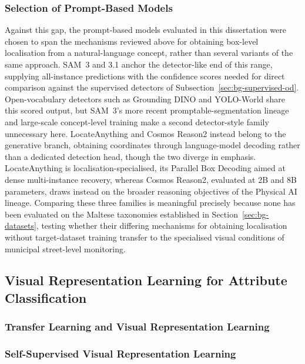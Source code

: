\subsubsection{Selection of Prompt-Based Models}
\label{sec:bg-zs-selection}
Against this gap, the prompt-based models evaluated in this dissertation were chosen to span the mechanisms reviewed above for obtaining box-level localisation from a natural-language concept, rather than several variants of the same approach. \gls{SAM}~3 and 3.1 anchor the detector-like end of this range, supplying all-instance predictions with the confidence scores needed for direct comparison against the supervised detectors of Subsection~\ref{sec:bg-supervised-od}. Open-vocabulary detectors such as Grounding DINO and YOLO-World share this scored output, but \gls{SAM}~3's more recent promptable-segmentation lineage and large-scale concept-level training make a second detector-style family unnecessary here. LocateAnything and Cosmos Reason2 instead belong to the generative branch, obtaining coordinates through language-model decoding rather than a dedicated detection head, though the two diverge in emphasis. LocateAnything is localisation-specialised, its Parallel Box Decoding aimed at dense multi-instance recovery, whereas Cosmos Reason2, evaluated at 2B and 8B parameters, draws instead on the broader reasoning objectives of the Physical \gls{AI} lineage. Comparing these three families is meaningful precisely because none has been evaluated on the Maltese taxonomies established in Section~\ref{sec:bg-datasets}, testing whether their differing mechanisms for obtaining localisation without target-dataset training transfer to the specialised visual conditions of municipal street-level monitoring.

\subsection{Visual Representation Learning for Attribute Classification}
\label{sec:bg-representation}

    \subsubsection{Transfer Learning and Visual Representation Learning}
    \label{sec:bg-transfer-learning}

    \subsubsection{Self-Supervised Visual Representation Learning}
    \label{sec:bg-self-supervised}

